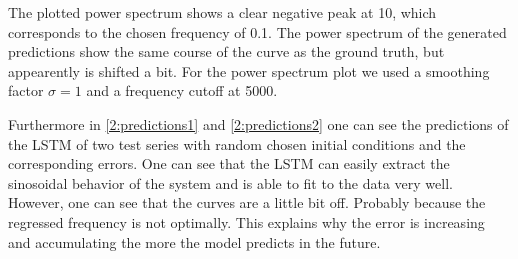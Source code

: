 The plotted power spectrum shows a clear negative peak at 10, which corresponds to the chosen frequency of 0.1. %
The power spectrum of the generated predictions show the same course of the curve as the ground truth, but appearently is shifted a bit. For the power spectrum plot we used a smoothing factor $\sigma=1$ and a frequency cutoff at 5000.

\FloatBarrier
Furthermore in \cref{2:predictions1} and \cref{2:predictions2} one can see the predictions of the LSTM of two test series with random chosen initial conditions and the corresponding errors. One can see that the LSTM can easily extract the sinosoidal behavior of the system and is able to fit to the data very well. However, one can see that the curves are a little bit off. Probably because the regressed frequency is not optimally. This explains why the error is increasing and accumulating the more the model predicts in the future.
